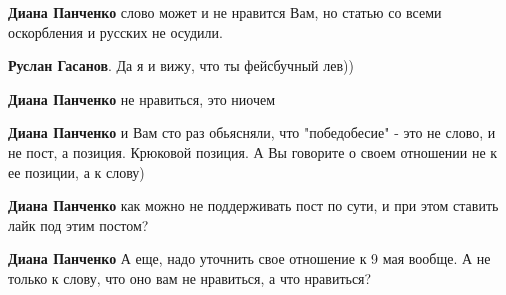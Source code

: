 \begin{itemize}
\begin{itemize}
\textbf{Диана Панченко} слово может и не нравится Вам, но статью со всеми оскорбления и русских не осудили.

 
\textbf{Руслан Гасанов}. Да я и вижу, что ты фейсбучный лев))

 
\textbf{Диана Панченко} не нравиться, это ниочем

 
\textbf{Диана Панченко} и Вам сто раз обьясняли, что "победобесие" - это не
слово, и не пост, а позиция. Крюковой позиция. А Вы говорите о своем отношении
не к ее позиции, а к слову)

 
\textbf{Диана Панченко} как можно не поддерживать пост по сути, и при этом ставить лайк под этим постом?

 
\textbf{Диана Панченко} А еще, надо уточнить свое отношение к 9 мая вообще. А
не только к слову, что оно вам не нравиться, а что нравиться?

 

\end{itemize}
\end{itemize}
